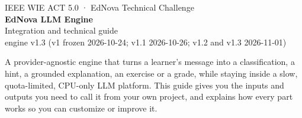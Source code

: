 \documentclass[11pt,a4paper]{article}
\renewcommand{\_}{\origus\allowbreak}
\begin{document}
\begin{titlepage}
\vspace*{1.2cm}
{\color{white}\sffamily
{\small IEEE WIE ACT 5.0 · EdNova Technical Challenge}\\[0.9em]
{\fontsize{30}{34}\selectfont\bfseries EdNova LLM Engine}\\[0.6em]
{\Large Integration and technical guide}\\[0.4em]
{\normalsize engine v1.3 (v1 frozen 2026-10-24; v1.1 2026-10-26; v1.2 and v1.3 2026-11-01)}\par}
\vspace{3.4cm}

\begin{minipage}{0.92\textwidth}
\large
A provider-agnostic engine that turns a learner's message into a classification, a hint, a
grounded explanation, an exercise or a grade, while staying inside a slow, quota-limited,
CPU-only LLM platform. This guide gives you the inputs and outputs you need to call it from your
own project, and explains how every part works so you can customize or improve it.
\end{minipage}


\end{titlepage}
\end{document}
